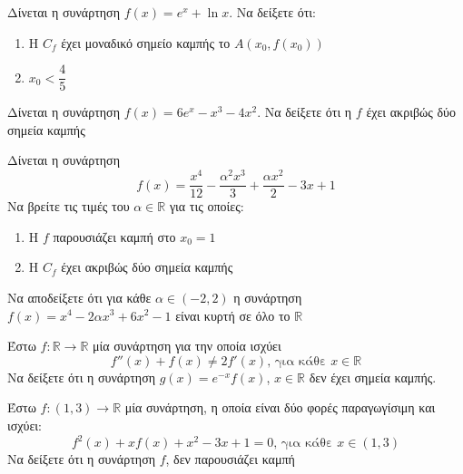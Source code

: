 \documentclass{presentation}
\begin{document}
\begin{askisi}
    Δίνεται η συνάρτηση $f(x)=e^x+\ln x$. Να δείξετε ότι:
    \begin{enumerate}
        \item<1-> Η $C_f$ έχει μοναδικό σημείο καμπής το $Α(x_0,f(x_0))$
        \item<2-> $x_0<\dfrac{4}{5}$
    \end{enumerate}

\end{askisi}

\begin{askisi}
    Δίνεται η συνάρτηση $f(x)=6e^x-x^3-4x^2$. Να δείξετε ότι η $f$ έχει ακριβώς δύο σημεία καμπής

\end{askisi}

\begin{askisi}
    Δίνεται η συνάρτηση $$f(x)=\dfrac{x^4}{12}-\dfrac{α^2x^3}{3}+\dfrac{αx^2}{2}-3x+1$$
    Να βρείτε τις τιμές του $α\in\mathbb{R}$ για τις οποίες:
    \begin{enumerate}
        \item<1-> Η $f$ παρουσιάζει καμπή στο $x_0=1$
        \item<2-> Η $C_f$ έχει ακριβώς δύο σημεία καμπής
    \end{enumerate}

\end{askisi}

\begin{askisi}
    Να αποδείξετε ότι για κάθε $α\in (-2,2)$ η συνάρτηση $f(x)=x^4-2αx^3+6x^2-1$ είναι κυρτή σε όλο το $\mathbb{R}$

\end{askisi}

\begin{askisi}
    Έστω $f:\mathbb{R}\to\mathbb{R}$ μία συνάρτηση για την οποία ισχύει
    $$f''(x)+f(x)\ne 2f'(x)\text{, για κάθε } x\in\mathbb{R}$$
    Να δείξετε ότι η συνάρτηση $g(x)=e^{-x}f(x)$, $x\in\mathbb{R}$ δεν έχει σημεία καμπής.

\end{askisi}

\begin{askisi}

    Έστω $f:(1,3)\to\mathbb{R}$ μία συνάρτηση, η οποία είναι δύο φορές παραγωγίσιμη και ισχύει:
    $$f^2(x)+xf(x)+x^2-3x+1=0\text{, για κάθε } x\in (1,3)$$
    Να δείξετε ότι η συνάρτηση $f$, δεν παρουσιάζει καμπή

\end{askisi}
\end{document}
